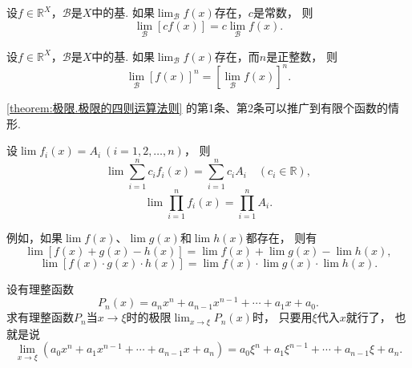 \begin{corollary}
设\(f\in\mathbb{R}^X\)，\(\mathcal{B}\)是\(X\)中的基.
如果\(\lim_\mathcal{B} f(x)\)存在，\(c\)是常数，
则\[
	\lim_\mathcal{B} [c f(x)] = c \lim_\mathcal{B} f(x).
\]
\end{corollary}

\begin{corollary}
设\(f\in\mathbb{R}^X\)，\(\mathcal{B}\)是\(X\)中的基.
如果\(\lim_\mathcal{B} f(x)\)存在，而\(n\)是正整数，
则\[\lim_\mathcal{B} [f(x)]^n = [\lim_\mathcal{B} f(x)]^n.\]
\end{corollary}

\cref{theorem:极限.极限的四则运算法则} 的第1条、第2条可以推广到有限个函数的情形.
\begin{corollary}
设\(\lim f_i(x) = A_i\ (i=1,2,\dotsc,n)\)，
则\[
	\lim \sum_{i=1}^n c_i f_i(x) = \sum_{i=1}^n c_i A_i
	\quad(c_i\in\mathbb{R}),
\]\[
	\lim \prod_{i=1}^n f_i(x) = \prod_{i=1}^n A_i.
\]
\end{corollary}
例如，如果\(\lim f(x)\)、\(\lim g(x)\)和\(\lim h(x)\)都存在，
则有\[
	\lim[f(x) + g(x) - h(x)] = \lim f(x) + \lim g(x) - \lim h(x),
\]\[
	\lim[f(x) \cdot g(x) \cdot h(x)] = \lim f(x) \cdot \lim g(x) \cdot \lim h(x).
\]

\begin{example}
设有理整函数\[
	P_n(x) = a_n x^n + a_{n-1} x^{n-1} + \dotsb + a_1 x + a_0.
\]
求有理整函数\(P_n\)当\(x\to\xi\)时的极限\(\lim_{x\to\xi} P_n(x)\)时，
只要用\(\xi\)代入\(x\)就行了，
也就是说\begin{equation}\label{equation:函数极限.重要极限3}
	\lim_{x \to \xi} (a_0 x^n + a_1 x^{n-1} + \dotsb + a_{n-1} x + a_n)
	= a_0 \xi^n + a_1 \xi^{n-1} + \dotsb + a_{n-1} \xi + a_n.
\end{equation}
\end{example}

